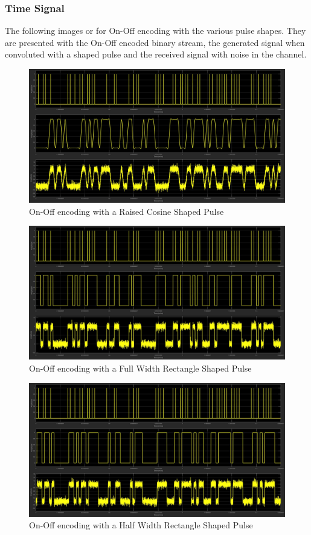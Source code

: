 \documentclass{article}
\begin{document}
\subsubsection{Time Signal}
The following images or for On-Off encoding with the various pulse shapes. They
are presented with the On-Off encoded binary stream, the generated signal when
convoluted with a shaped pulse and the received signal with noise in the channel.
\begin{figure}[H]
  \includegraphics[width = \linewidth]{OO_Rasied.jpg}
  \caption{On-Off encoding with a Raised Cosine Shaped Pulse}
  \label{fig:OO-Raised}
\end{figure}
\begin{figure}[H]
  \includegraphics[width = \linewidth]{OO_Rect_F.jpg}
  \caption{On-Off encoding with a Full Width Rectangle Shaped Pulse}
  \label{fig:OO-Rect-F}
\end{figure}
\begin{figure}[H]
  \includegraphics[width = \linewidth]{OO_Rect_H.jpg}
  \caption{On-Off encoding with a Half Width Rectangle Shaped Pulse}
  \label{fig:OO-Rect-H}
\end{figure}
\end{document}
